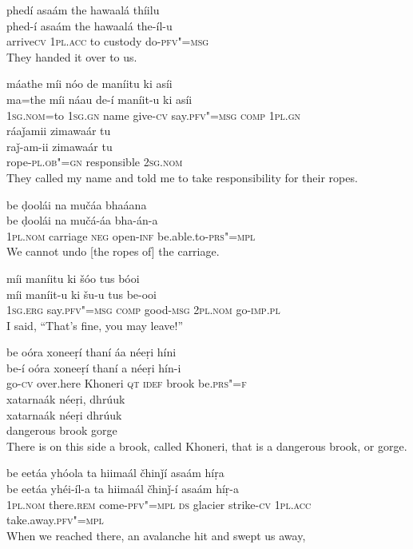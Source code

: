 \begin{exe}
\ex
\label{ex:7}
\glll phedí	asaám	the	hawaalá	thíilu \\
phed-í	asaám	the	hawaalá	the-íl-u \\
arrive\textsc{cv}	\textsc{1pl.acc}	to	custody	do-\textsc{pfv"=msg} \\
\glt They handed it over to us.

\ex
\label{ex:8}
\glll máathe	míi	nóo	de	maníitu	ki	asíi \\
ma=the	míi	náau	de-í	maníit-u	ki	asíi \\
\textsc{1sg.nom}=to \textsc{1sg.gn}	name	give-\textsc{cv}	say.\textsc{pfv"=msg}	   \textsc{comp} \textsc{1pl.gn} \\
\glll ráaǰamii	zimawaár	tu \\
raǰ-am-ii	zimawaár	tu \\
rope-\textsc{pl.ob"=gn}	responsible	\textsc{2sg.nom} \\
\glt They called my name and told me to take responsibility for their ropes.

\ex
\label{ex:9}
\glll be	ḍoolái	na	mučáa	bhaáana \\
be	ḍoolái	na	mučá-áa	bha-án-a \\
\textsc{1pl.nom}	carriage \textsc{neg}	open-\textsc{inf}	be.able.to-\textsc{prs"=mpl} \\
\glt We cannot undo [the ropes of] the carriage.

\ex
\label{ex:10}
\glll míi	maníitu	ki	šóo	tus	bóoi \\
míi	maníit-u	ki	šu-u	tus	be-ooi \\
\textsc{1sg.erg}	say.\textsc{pfv"=msg} \textsc{comp}	good-\textsc{msg} \textsc{2pl.nom}	go-\textsc{imp.pl} \\
\glt I said, “That’s fine, you may leave!”

\ex
\label{ex:11}
\glll be	oóra	xoneeṛí	thaní	áa	néeṛi	híni \\
be-í	oóra	xoneeṛí	thaní	a	néeṛi	hín-i \\
go-\textsc{cv}	over.here	Khoneri	\textsc{qt}	\textsc{idef}	brook	be.\textsc{prs"=f} \\
\glll xatarnaák	néeṛi,	dhrúuk \\
xatarnaák	néeṛi	dhrúuk \\
dangerous	brook	gorge \\
\glt There is on this side a brook, called Khoneri, that is a dangerous brook, or gorge.

\ex
\label{ex:12}
\glll be	eetáa	yhóola	ta	hiimaál	čhinǰí asaám	híṛa \\
be	eetáa	yhéi-íl-a	ta	hiimaál	čhinǰ-í asaám	híṛ-a \\
\textsc{1pl.nom}	there.\textsc{rem}	come-\textsc{pfv"=mpl}	\textsc{ds}	glacier	strike-\textsc{cv} \textsc{1pl.acc}	take.away.\textsc{pfv"=mpl} \\
\glt When we reached there, an avalanche hit and swept us away,


\end{exe}
